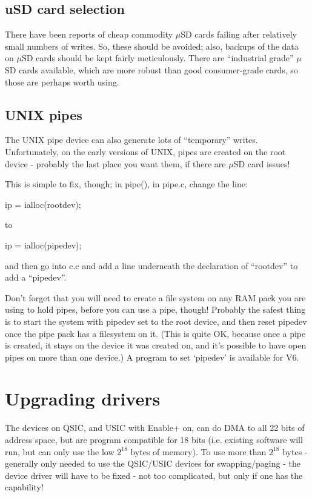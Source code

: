 \subsection{uSD card selection}

There have been reports of cheap commodity $\mu$SD cards failing after relatively
small numbers of writes. So, these should be avoided; also, backups of the
data on $\mu$SD cards should be kept fairly meticulously. There are ``industrial
grade'' $\mu$SD cards available, which are more robust than good consumer-grade
cards, so those are perhaps worth using.

\subsection{UNIX pipes}

The UNIX pipe device can also generate lots of ``temporary'' writes.
Unfortunately, on the early versions of UNIX, pipes are created on the root
device - probably the last place you want them, if there are $\mu$SD card issues!

This is simple to fix, though; in pipe(), in pipe.c, change the line:

	ip = ialloc(rootdev);

to

	ip = ialloc(pipedev);

and then go into c.c and add a line underneath the declaration of ``rootdev''
to add a ``pipedev''.

Don't forget that you will need to create a file system on any RAM pack you
are using to hold pipes, before you can use a pipe, though! Probably the
safest thing is to start the system with pipedev set to the root device, and
then reset pipedev once the pipe pack has a filesystem on it. (This is quite
OK, because once a pipe is created, it stays on the device it was created on,
and it's possible to have open pipes on more than one device.) A program to
set `pipedev' is available for V6.

\section{Upgrading drivers}

The devices on QSIC, and USIC with Enable+ on, can do DMA to all 22 bits of
address space, but are program compatible for 18 bits (i.e. existing software
will run, but can only use the low $2^{18}$ bytes of memory). To use more
than $2^{18}$ bytes - generally only needed to use the QSIC/USIC devices for
swapping/paging - the device driver will have to be fixed - not too
complicated, but only if one has the capability!

